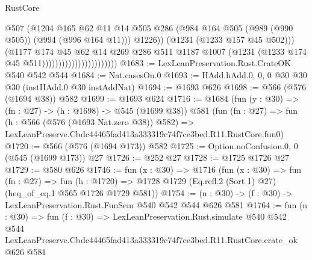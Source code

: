 \begin{lexlean}{RustCore}
\begin{coremodule}
                                                @507
                                                (@1204
                                                  @165
                                                  @62
                                                  @11
                                                  @14
                                                  @505
                                                  @286
                                                  (@984
                                                    @164
                                                    @505
                                                    (@989 (@990 @505))
                                                    (@994 (@996 @164 @11)))
                                                  @1226))
                                              (@1231 (@1233 @157 @45 @502)))
                                            (@1177
                                              @174
                                              @45
                                              @62
                                              @14
                                              @269
                                              @286
                                              @511
                                              @1187
                                              @1007
                                              (@1231 (@1233 @174 @45 @511)))))))))))))))))))))))
@1683 := LexLeanPreservation.Rust.CrateOK @540 @542 @544
@1684 := Nat.casesOn.{0}
@1693 := HAdd.hAdd.{0, 0, 0} @30 @30 @30 (instHAdd.{0} @30 instAddNat)
@1694 := @1693 @626
@1698 := @566 (@576 (@1694 @38)) @582
@1699 := @1693 @624
@1716 := @1684
    (fun (y : @30) => (fn : @27) -> (h : @1698) -> @545 (@1699 @38))
    @581
    (fun (fn : @27) =>
    fun (h : @566 (@576 (@1693 Nat.zero @38)) @582) =>
    LexLeanPreserve.Cbdc44465fad413a333319c74f7ce3bed.R11.RustCore.fun0)
@1720 := @566 (@576 (@1694 @173)) @582
@1725 := Option.noConfusion.{0, 0} (@545 (@1699 @173)) @27
@1726 := @252 @27
@1728 := @1725 @1726 @27
@1729 := @580 @626
@1746 := fun (x : @30) =>
  @1716
    (fun (x : @30) =>
    fun (fn : @27) =>
    fun (h : @1720) => @1728 @1729 (Eq.refl.{2} (Sort 1) @27) (heq_of_eq.{1} @565 @1726 @1729 @581))
@1754 := (n : @30) -> (f : @30) -> LexLeanPreservation.Rust.FunSem @540 @542 @544 @626 @581
@1764 := fun (n : @30) =>
  fun (f : @30) =>
  LexLeanPreservation.Rust.simulate
    @540
    @542
    @544
    LexLeanPreserve.Cbdc44465fad413a333319c74f7ce3bed.R11.RustCore.crate_ok
    @626
    @581
\end{coremodule}
\end{lexlean}

